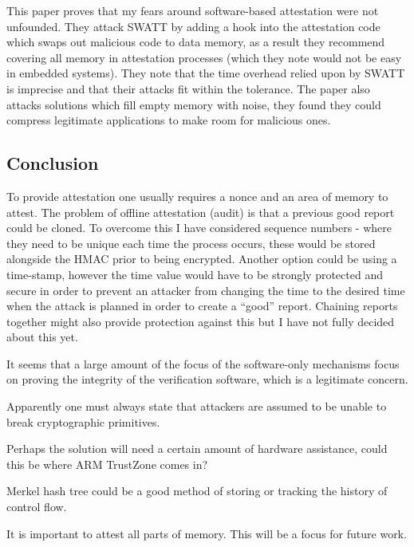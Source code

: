 This paper \cite{Castelluccia2009} proves that my fears around software-based attestation were not unfounded. They attack SWATT \cite{Seshadri2004} by adding a hook into the attestation code which swaps out malicious code to data memory, as a result they recommend covering all memory in attestation processes (which they note would not be easy in embedded systems). They note that the time overhead relied upon by SWATT \cite{Seshadri2004} is imprecise and that their attacks fit within the tolerance. The paper also attacks solutions which fill empty memory with noise, they found they could compress legitimate applications to make room for malicious ones.

\subsection{Conclusion}

To provide attestation one usually requires a nonce and an area of memory to attest. The problem of offline attestation (audit) is that a previous good report could be cloned. To overcome this I have considered sequence numbers - where they need to be unique each time the process occurs, these would be stored alongside the HMAC prior to being encrypted. Another option could be using a time-stamp, however the time value would have to be strongly protected and secure in order to prevent an attacker from changing the time to the desired time when the attack is planned in order to create a “good” report. Chaining reports together might also provide protection against this but I have not fully decided about this yet.

It seems that a large amount of the focus of the software-only mechanisms focus on proving the integrity of the verification software, which is a legitimate concern.

Apparently one must always state that attackers are assumed to be unable to break cryptographic primitives.

Perhaps the solution will need a certain amount of hardware assistance, could this be where ARM TrustZone comes in?

Merkel hash tree could be a good method of storing or tracking the history of control flow.

It is important to attest all parts of memory. This will be a focus for future work.
